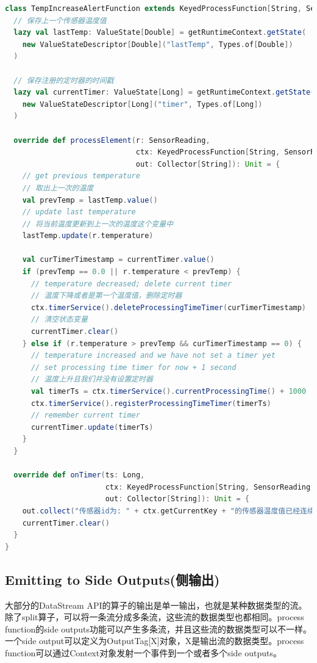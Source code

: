 \documentclass[oneside]{ctexbook}
\begin{document}
\begin{lstlisting}[language=scala]
class TempIncreaseAlertFunction extends KeyedProcessFunction[String, SensorReading, String] {
  // 保存上一个传感器温度值
  lazy val lastTemp: ValueState[Double] = getRuntimeContext.getState(
    new ValueStateDescriptor[Double]("lastTemp", Types.of[Double])
  )

  // 保存注册的定时器的时间戳
  lazy val currentTimer: ValueState[Long] = getRuntimeContext.getState(
    new ValueStateDescriptor[Long]("timer", Types.of[Long])
  )

  override def processElement(r: SensorReading,
                              ctx: KeyedProcessFunction[String, SensorReading, String]#Context,
                              out: Collector[String]): Unit = {
    // get previous temperature
    // 取出上一次的温度
    val prevTemp = lastTemp.value()
    // update last temperature
    // 将当前温度更新到上一次的温度这个变量中
    lastTemp.update(r.temperature)

    val curTimerTimestamp = currentTimer.value()
    if (prevTemp == 0.0 || r.temperature < prevTemp) {
      // temperature decreased; delete current timer
      // 温度下降或者是第一个温度值，删除定时器
      ctx.timerService().deleteProcessingTimeTimer(curTimerTimestamp)
      // 清空状态变量
      currentTimer.clear()
    } else if (r.temperature > prevTemp && curTimerTimestamp == 0) {
      // temperature increased and we have not set a timer yet
      // set processing time timer for now + 1 second
      // 温度上升且我们并没有设置定时器
      val timerTs = ctx.timerService().currentProcessingTime() + 1000
      ctx.timerService().registerProcessingTimeTimer(timerTs)
      // remember current timer
      currentTimer.update(timerTs)
    }
  }

  override def onTimer(ts: Long,
                       ctx: KeyedProcessFunction[String, SensorReading, String]#OnTimerContext,
                       out: Collector[String]): Unit = {
    out.collect("传感器id为: " + ctx.getCurrentKey + "的传感器温度值已经连续1s上升了。")
    currentTimer.clear()
  }
}
\end{lstlisting}

\subsection{Emitting to Side Outputs(侧输出)}

大部分的DataStream API的算子的输出是单一输出，也就是某种数据类型的流。除了split算子，可以将一条流分成多条流，这些流的数据类型也都相同。process function的side outputs功能可以产生多条流，并且这些流的数据类型可以不一样。一个side output可以定义为OutputTag[X]对象，X是输出流的数据类型。process function可以通过Context对象发射一个事件到一个或者多个side outputs。
\end{document}
